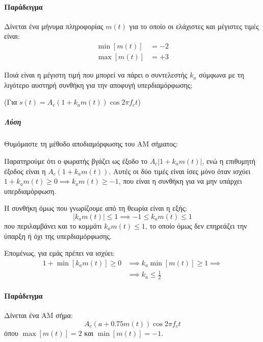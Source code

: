 \documentclass[11pt,a4paper,notitlepage,fleqn]{article}
\begin{document}
\paragraph{Παράδειγμα}
Δίνεται ένα μήνυμα πληροφορίας \( m(t) \) για το οποίο οι ελάχιστες και μέγιστες τιμές
είναι:
\begin{align*}
\min\left[m(t)\right] &= -2\\
\max\left[m(t)\right] &= +3
\end{align*}

Ποιά είναι η μέγιστη τιμή που μπορεί να πάρει ο συντελεστής \( k_a \) σύμφωνα με τη
λιγότερο αυστηρή συνθήκη για την αποφυγή υπερδιαμόρφωσης;

(Για \( s(t) = A_c(1+k_am(t)) \cos2πf_ct \))

\subparagraph{Λύση}

Θυμόμαστε τη μέθοδο αποδιαμόρφωσης του AM σήματος:


Παρατηρούμε ότι ο φωρατής βγάζει ως έξοδο το \( A_c\left|1+k_a m(t)\right| \),
ενώ η επιθυμητή έξοδος είναι η \( A_c\left(1+k_a m(t)\right) \). Αυτές οι δύο τιμές είναι
ίσες μόνο όταν ισχύει \( 1+k_a m(t) \geq 0 
\implies \boxed{k_am(t)} \geq -1 \), που είναι η συνθήκη για να μην υπάρχει
υπερδιαμόρφωση.

Η συνθήκη όμως που γνωρίζουμε από τη θεωρία είναι η εξής:
\[
\left| k_am(t) \right| \leq 1 \implies -1 \leq k_a m(t) \leq 1
\]
που περιλαμβάνει και το κομμάτι \( k_am(t) \leq 1 \), το οποίο όμως δεν επηρεάζει την
ύπαρξη ή όχι της υπερδιαμόρφωσης.

Επομένως, για εμάς πρέπει να ισχύει:
\begin{align*}
	1+\min\left[ k_am(t) \right] \geq 0 &\implies
	k_a\min\left[ m(t) \right] \geq 1 \implies \\ &\implies \boxed{
		k_a \leq \frac{1}{2}
		}
\end{align*}

\paragraph{Παράδειγμα}
Δίνεται ένα AM σήμα:
\[
A_c\left( a+0.75m(t) \right)\cos 2πf_c t
\]
όπου \( \max\left[m(t)\right] = 2 \) και \( \min\left[m(t)\right] = -1\).
\end{document}

